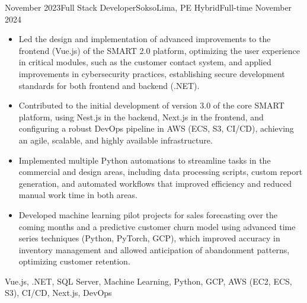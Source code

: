 \begin{experiences}
\experience
  {November 2023}{Full Stack Developer}{Sokso}{Lima, PE}
  {Hybrid}{Full-time}
  {November 2024} {
    \begin{itemize}
      \item Led the design and implementation of advanced improvements to the frontend (Vue.js) of the SMART 2.0 platform, optimizing the user experience in critical modules, such as the customer contact system, and applied improvements in cybersecurity practices, establishing secure development standards for both frontend and backend (.NET).
      \item Contributed to the initial development of version 3.0 of the core SMART platform, using Nest.js in the backend, Next.js in the frontend, and configuring a robust DevOps pipeline in AWS (ECS, S3, CI/CD), achieving an agile, scalable, and highly available infrastructure.
      \item Implemented multiple Python automations to streamline tasks in the commercial and design areas, including data processing scripts, custom report generation, and automated workflows that improved efficiency and reduced manual work time in both areas.
      \item Developed machine learning pilot projects for sales forecasting over the coming months and a predictive customer churn model using advanced time series techniques (Python, PyTorch, GCP), which improved accuracy in inventory management and allowed anticipation of abandonment patterns, optimizing customer retention.
    \end{itemize}
  }
  {Vue.js, .NET, SQL Server, Machine Learning, Python, GCP, {AWS (EC2, ECS, S3)}, CI/CD, Next.js, DevOps}


\end{experiences}
